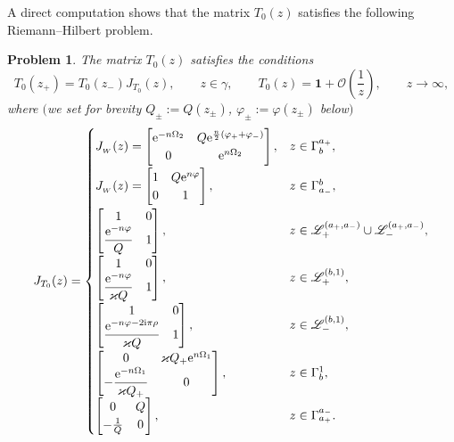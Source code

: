 \documentclass[10pt,a4paper]{amsart}
\numberwithin{equation}{section}
\newtheorem{problem}[Theorem]{Problem}
\theoremstyle{definition}
\def \scr{\mathscr}
\def\le{\left}
\def\ri{\right}
\def \1{\mathbf 1}
\begin{document}
A direct computation shows that the matrix $T_0(z)$ satisfies the following Riemann--Hilbert problem.

\begin{problem}\label{RHPT0g1s<0}
The matrix $T_0(z)$ satisfies the conditions
\[
T_0(z_+)= T_0(z_-) J_{T_0}(z), \qquad z\in \gamma,\qquad
T_0(z) = \1 + \mathcal O\le(\frac 1 z \ri), \qquad z\to \infty,
\]
where $($we set for brevity $Q_\pm:= Q(z_\pm)$, $\varphi_\pm := \varphi(z_\pm)$ below$)$
\[
J_{T_0}(z) =
\begin{cases}
J_{_W}(z) =
 \begin{bmatrix}
{\rm e}^{-n\Omega_2} & Q{\rm e}^{\frac n2 (\varphi_++\varphi_-)} \\
0 & {\rm e}^{n\Omega_2}
\end{bmatrix},
 & z\in \Gamma_{b}^{a_+},\\[10pt]
 J_{_W}(z) =
 \begin{bmatrix}
1 & Q{\rm e}^{n \varphi } \\
0 &1
\end{bmatrix},
 & z\in \Gamma^{b}_{a_-},\\[10pt]
 \begin{bmatrix}
1 & 0 \\
\displaystyle\frac{ {\rm e}^{-n\varphi} }{ Q} & 1
\end{bmatrix},
& z\in \scr L_+^{(a_+,a_-)}\cup \scr L_-^{(a_+,a_-)},
\\[10pt]
 \begin{bmatrix}
1 & 0 \\
\displaystyle \frac{ {\rm e}^{-n\varphi} }{\varkappa Q} & 1
\end{bmatrix},
& z\in \scr L_+^{(b,1)},
\\[10pt]
\begin{bmatrix}
1 & 0 \\
\displaystyle \frac{ {\rm e}^{-n\varphi-2{\rm i}\pi { {\rho}}} }{\varkappa Q} & 1
\end{bmatrix},
& z\in \scr L_-^{(b,1)},
\\[10pt]
\begin{bmatrix}
 0 & \varkappa Q_+ {\rm e}^{n\Omega_1}\\
\displaystyle -\frac {{\rm e}^{-n\Omega_1}} {\varkappa Q_+} & 0
\end{bmatrix},
 & z\in \Gamma_b^1,
\\[10pt]
\begin{bmatrix}
 0 & Q \\
 -\frac {1} { Q} & 0
\end{bmatrix},
 & z\in \Gamma_{a_+}^{a_-}.
\end{cases}\]
\end{problem}
\end{document}
